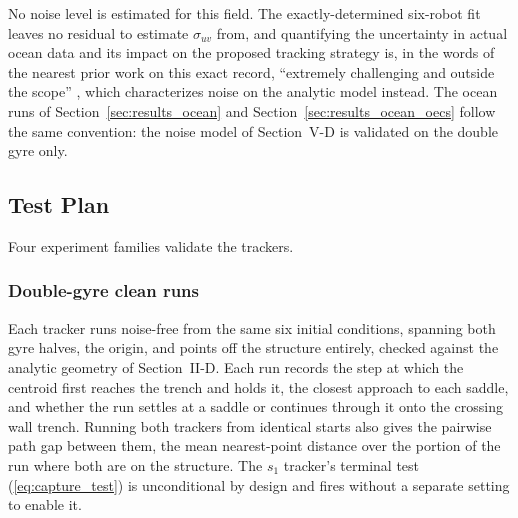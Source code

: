 \documentclass[lettersize,journal]{IEEEtran}
\begin{document}
No noise level is estimated for this field. The exactly-determined
six-robot fit leaves no residual to estimate $\sigma_{uv}$ from, and
quantifying the uncertainty in actual ocean data and its impact on the
proposed tracking strategy is, in the words of the nearest prior work
on this exact record, ``extremely challenging and outside the scope''
\cite{9}, which characterizes noise on the analytic model instead. The
ocean runs of Section~\ref{sec:results_ocean} and
Section~\ref{sec:results_ocean_oecs} follow the same convention: the
noise model of Section~\mbox{V-D} is validated on the double gyre only.

\subsection{Test Plan}
\label{sec:test_plan}

Four experiment families validate the trackers.

\subsubsection{Double-gyre clean runs}
Each tracker runs noise-free from the same six initial conditions,
spanning both gyre halves, the origin, and points off the structure
entirely, checked against the analytic geometry of Section~\mbox{II-D}. Each
run records the step at which the
centroid first reaches the trench and holds it, the closest approach to
each saddle, and whether the run settles at a saddle or continues
through it onto the crossing wall trench. Running both trackers from
identical starts also gives the pairwise path gap between them, the mean
nearest-point distance over the portion of the run where both are on the
structure. The $s_1$ tracker's terminal test (\ref{eq:capture_test}) is
unconditional by design and fires without a separate setting to enable it.
\end{document}
